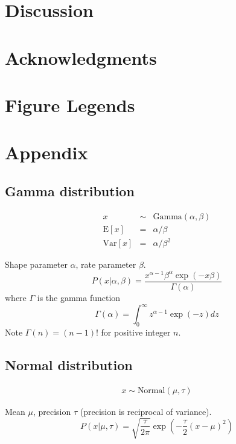 \documentclass[10pt]{article}
\begin{document}
\section{Discussion}


\newpage
\section{Acknowledgments}



\clearpage
\section{Figure Legends}

\clearpage
\section{Appendix}

\subsection{Gamma distribution}

\begin{eqnarray*}
x & \sim & \mbox{Gamma}(\alpha,\beta) \\
\mbox{E}[x] & = & \alpha/\beta \\
\mbox{Var}[x] & = & \alpha/\beta^2
\end{eqnarray*}

Shape parameter $\alpha$, rate parameter $\beta$.
\[
P(x|\alpha,\beta) = \frac{x^{\alpha-1} \beta^\alpha \exp(-x \beta)}{\Gamma(\alpha)}
\]
where $\Gamma$ is the gamma function
\[
\Gamma(\alpha) = \int_0^{\infty} z^{\alpha-1} \exp(-z) dz
\]
Note $\Gamma(n) = (n-1)!$ for positive integer $n$.

\subsection{Normal distribution}

\begin{eqnarray*}
x \sim \mbox{Normal}(\mu,\tau)
\end{eqnarray*}


Mean $\mu$, precision $\tau$ (precision is reciprocal of variance).
\[
P(x|\mu,\tau)
 = \sqrt{\frac{\tau}{2\pi}} \exp \left( -\frac{\tau}{2}(x-\mu)^2 \right)
\]
\end{document}
